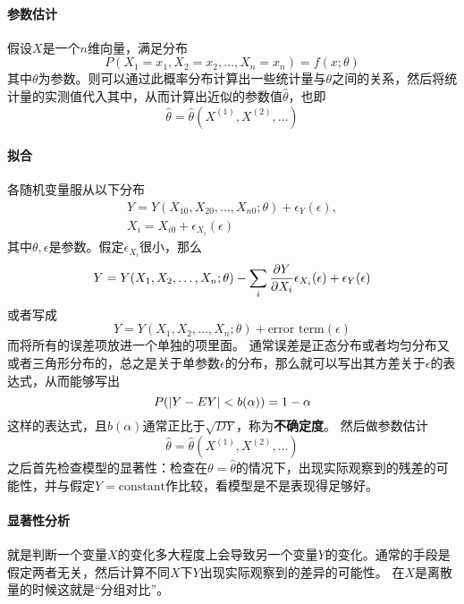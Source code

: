\documentclass[UTF8, a4paper]{ctexart}
\begin{document}
\paragraph{参数估计} 假设$X$是一个$n$维向量，满足分布
\[
    P(X_1 = x_1, X_2 = x_2 , \ldots, X_n = x_n) = f(x;\theta)
\]
其中$\theta$为参数。则可以通过此概率分布计算出一些统计量与$\theta$之间的关系，然后将统计量的实测值代入其中，从而计算出近似的参数值$\hat{\theta}$，也即
\[
    \hat{\theta} = \hat{\theta}(X^{(1)}, X^{(2)}, \ldots)
\]

\paragraph{拟合} 各随机变量服从以下分布
\[
    \begin{split}
        Y = Y(X_{10}, X_{20}, \ldots, X_{n0}; \theta) + \epsilon_Y(\epsilon), \\
        X_i = X_{i0} + \epsilon_{X_i}(\epsilon)
    \end{split}
\]
其中$\theta, \epsilon$是参数。假定$\epsilon_{X_i}$很小，那么
\[
    Y = Y(X_{1}, X_{2}, \ldots, X_{n}; \theta) - \sum_i \pdv{Y}{X_i} \epsilon_{X_i} (\epsilon) + \epsilon_Y(\epsilon)
\]
或者写成
\[
    Y = Y(X_{1}, X_{2}, \ldots, X_{n}; \theta) + \text{error term}(\epsilon)
\]
而将所有的误差项放进一个单独的项里面。
通常误差是正态分布或者均匀分布又或者三角形分布的，总之是关于单参数$\epsilon$的分布，那么就可以写出其方差关于$\epsilon$的表达式，从而能够写出
\[
    P(\abs{Y - EY} < b(\alpha)) = 1 - \alpha
\]
这样的表达式，且$b(\alpha)$通常正比于$\sqrt{DY}$，称为\textbf{不确定度}。
然后做参数估计
\[
    \hat{\theta} = \hat{\theta} (X^{(1)}, X^{(2)}, \ldots)
\]
之后首先检查模型的显著性：检查在$\theta = \hat{\theta}$的情况下，出现实际观察到的残差的可能性，并与假定$Y=\text{constant}$作比较，看模型是不是表现得足够好。

\paragraph{显著性分析} 就是判断一个变量$X$的变化多大程度上会导致另一个变量$Y$的变化。通常的手段是假定两者无关，然后计算不同$X$下$Y$出现实际观察到的差异的可能性。
在$X$是离散量的时候这就是“分组对比”。
\end{document}
